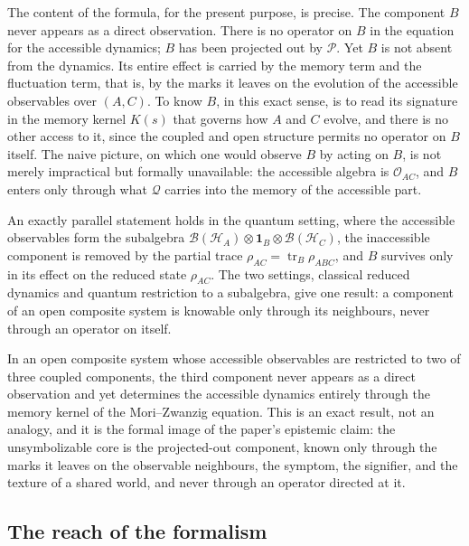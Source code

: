 The content of the formula, for the present purpose, is precise. The component $B$ never appears as a direct observation. There is no operator on $B$ in the equation for the accessible dynamics; $B$ has been projected out by $\mathcal{P}$. Yet $B$ is not absent from the dynamics. Its entire effect is carried by the memory term and the fluctuation term, that is, by the marks it leaves on the evolution of the accessible observables over $(A,C)$. To know $B$, in this exact sense, is to read its signature in the memory kernel $K(s)$ that governs how $A$ and $C$ evolve, and there is no other access to it, since the coupled and open structure permits no operator on $B$ itself. The naive picture, on which one would observe $B$ by acting on $B$, is not merely impractical but formally unavailable: the accessible algebra is $\mathcal{O}_{AC}$, and $B$ enters only through what $\mathcal{Q}$ carries into the memory of the accessible part.

An exactly parallel statement holds in the quantum setting, where the accessible observables form the subalgebra $\mathcal{B}(\mathcal{H}_A) \otimes \mathbf{1}_B \otimes \mathcal{B}(\mathcal{H}_C)$, the inaccessible component is removed by the partial trace $\rho_{AC} = \operatorname{tr}_B \rho_{ABC}$, and $B$ survives only in its effect on the reduced state $\rho_{AC}$. The two settings, classical reduced dynamics and quantum restriction to a subalgebra, give one result: a component of an open composite system is knowable only through its neighbours, never through an operator on itself.

\begin{claim}
In an open composite system whose accessible observables are restricted to two of three coupled components, the third component never appears as a direct observation and yet determines the accessible dynamics entirely through the memory kernel of the Mori--Zwanzig equation. This is an exact result, not an analogy, and it is the formal image of the paper's epistemic claim: the unsymbolizable core is the projected-out component, known only through the marks it leaves on the observable neighbours, the symptom, the signifier, and the texture of a shared world, and never through an operator directed at it.
\end{claim}

\subsection*{The reach of the formalism}

